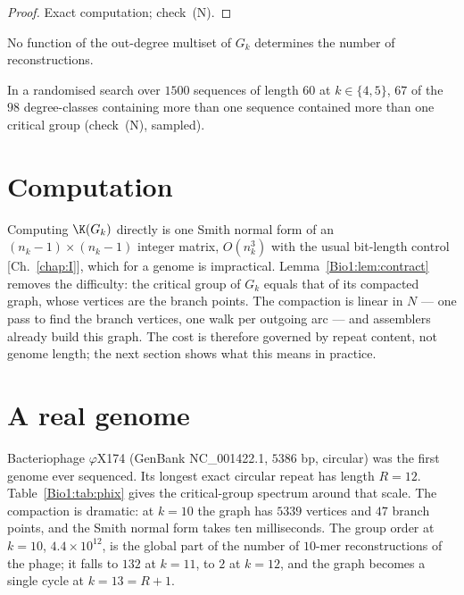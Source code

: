 \begin{proof}
Exact computation; check~(N).
\end{proof}

\begin{corollary}\label{Bio1:cor:insufficient}
No function of the out-degree multiset of $G_k$ determines the number of reconstructions.
\end{corollary}

In a randomised search over $1500$ sequences of length $60$ at $k\in\{4,5\}$, $67$ of the
$98$ degree-classes containing more than one sequence contained more than one critical
group (check~(N), sampled).

\section{Computation}\label{Bio1:sec:compute}

Computing $\K(G_k)$ directly is one Smith normal form of an $(n_k-1)\times(n_k-1)$ integer
matrix, $O(n_k^{3})$ with the usual bit-length control [Ch.~\ref{chap:I}], which for a genome
is impractical. Lemma~\ref{Bio1:lem:contract} removes the difficulty: the critical group of $G_k$
equals that of its compacted graph, whose vertices are the branch points. The compaction is
linear in $N$ --- one pass to find the branch vertices, one walk per outgoing arc --- and
assemblers already build this graph. The cost is therefore governed by repeat content, not
genome length; the next section shows what this means in practice.

\section{A real genome}\label{Bio1:sec:real}

Bacteriophage $\varphi$X174 (GenBank NC\_001422.1, $5386$ bp, circular) was the first
genome ever sequenced. Its longest exact circular repeat has length $R=12$.
Table~\ref{Bio1:tab:phix} gives the critical-group spectrum around that scale. The compaction
is dramatic: at $k=10$ the graph has $5339$ vertices and $47$ branch points, and the Smith
normal form takes ten milliseconds. The group order at $k=10$, $4.4\times10^{12}$, is the
global part of the number of $10$-mer reconstructions of the phage; it falls to $132$ at
$k=11$, to $2$ at $k=12$, and the graph becomes a single cycle at $k=13=R+1$.

